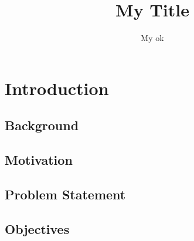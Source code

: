 \documentclass[two-side,openright,11pt]{report}
\begin{document}
\title{My Title}
\author{My  ok}
\maketitle

\tableofcontents

\chapter{Introduction}
\section{Background}
\section{Motivation}
\section{Problem Statement}
\section{Objectives}
\end{document}

